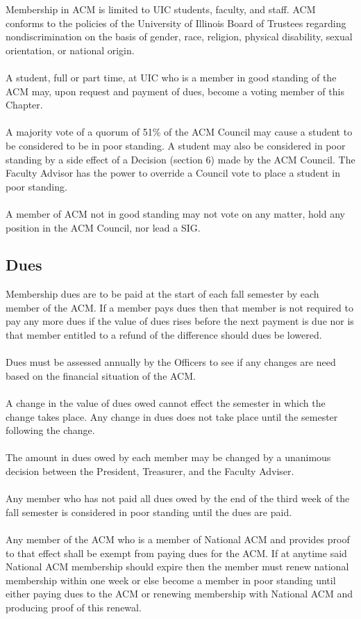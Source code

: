 \documentclass[12pt,titlepage]{article}
\begin{document}
Membership in ACM is limited to UIC students, faculty, and staff. ACM conforms to the policies of the University of Illinois Board of Trustees regarding nondiscrimination on the basis of gender, race, religion, physical disability, sexual orientation, or national origin.\\
\\
A student, full or part time, at UIC who is a member in good standing of the ACM may, upon request and payment of dues, become a voting member of this Chapter.\\
\\
A majority vote of a quorum of 51\% of the ACM Council may cause a student to be considered to be in poor standing. A student may also be considered in poor standing by a side effect of a Decision (section 6) made by the ACM Council. The Faculty Advisor has the power to override a Council vote to place a student in poor standing.\\
\\
A member of ACM not in good standing may not vote on any matter, hold any position in the ACM Council, nor lead a SIG.

\subsection{Dues}

Membership dues are to be paid at the start of each fall semester by each member of the ACM. If a member pays dues then that member is not required to pay any more dues if the value of dues rises before the next payment is due nor is that member entitled to a refund of the difference should dues be lowered.\\
\\
Dues must be assessed annually by the Officers to see if any changes are need based on the financial situation of the ACM.\\
\\
A change in the value of dues owed cannot effect the semester in which the change takes place. Any change in dues does not take place until the semester following the change.\\
\\
The amount in dues owed by each member may be changed by a unanimous decision between the President, Treasurer, and the Faculty Adviser.\\
\\
Any member who has not paid all dues owed by the end of the third week of the fall semester is considered in poor standing until the dues are paid.\\
\\
Any member of the ACM who is a member of National ACM and provides proof to that effect shall be exempt from paying dues for the ACM. If at anytime said National ACM membership should expire then the member must renew national membership within one week or else become a member in poor standing until either paying dues to the ACM or renewing membership with National ACM and producing proof of this renewal.\\
\end{document}
